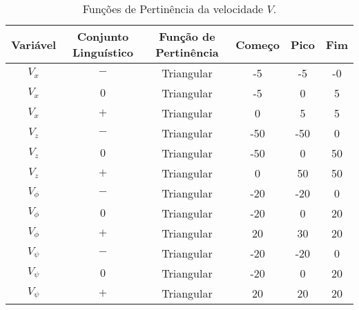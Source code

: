 \begin{table}[h!]
\centering
\begin{tabular}{|c|c|c|c|c|c|}
    \hline
    Variável & Conjunto Linguístico & Função de Pertinência & Começo & Pico & Fim \\
    \hline
    $V_x$ & $-$ & Triangular & -5 & -5 & -0 \\
    $V_x$ & $0$  & Triangular & -5 & 0 & 5 \\
    $V_x$ & $+$ & Triangular & 0 & 5 & 5 \\
    \hline
    $V_{z}$ & $-$  & Triangular & -50 & -50 & 0 \\
    $V_{z}$ & $0$  & Triangular & -50 & 0 & 50 \\
    $V_{z}$ & $+$  & Triangular & 0 & 50 & 50 \\
    \hline
    $V_{\phi}$ & $-$  & Triangular & -20 & -20 & 0 \\
    $V_{\phi}$ & $0$  & Triangular & -20 & 0 & 20 \\
    $V_{\phi}$ & $+$  & Triangular & 20 & 30 & 20 \\
    \hline
    $V_{\psi}$ & $-$  & Triangular & -20 & -20 & 0 \\
    $V_{\psi}$ & $0$  & Triangular & -20 & 0 & 20 \\
    $V_{\psi}$ & $+$  & Triangular & 20 & 20 & 20 \\
    \hline
\end{tabular}
\caption{Funções de Pertinência da velocidade $V$.}
\label{tab:fuzzy_error}
\end{table}


